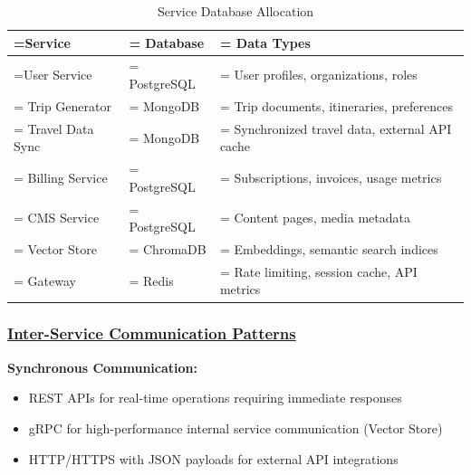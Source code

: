 \begin{table}[H]
    \renewcommand{\arraystretch}{1.3}
    \caption{Service Database Allocation}
    \centering
    \medskip
    \begin{tabularx}{1\textwidth} {
            | >{\hsize=0.6\hsize\linewidth=\hsize\centering\arraybackslash}X
            | >{\hsize=0.7\hsize\linewidth=\hsize\centering\arraybackslash}X
            | >{\hsize=0.7\hsize\linewidth=\hsize\justifying\arraybackslash}X |}
        \hline
        \textbf{Service} & \textbf{Database} & \textbf{Data Types}                          \\
        \hline
        User Service     & PostgreSQL        & User profiles, organizations, roles          \\
        \hline
        Trip Generator   & MongoDB           & Trip documents, itineraries, preferences     \\
        \hline
        Travel Data Sync & MongoDB           & Synchronized travel data, external API cache \\
        \hline
        Billing Service  & PostgreSQL        & Subscriptions, invoices, usage metrics       \\
        \hline
        CMS Service      & PostgreSQL        & Content pages, media metadata                \\
        \hline
        Vector Store     & ChromaDB          & Embeddings, semantic search indices          \\
        \hline
        Gateway          & Redis             & Rate limiting, session cache, API metrics    \\
        \hline
    \end{tabularx}
\end{table}

\subsubsection*{\underline{Inter-Service Communication Patterns}}

\textbf{Synchronous Communication:}
\begin{itemize}
    \item REST APIs for real-time operations requiring immediate responses
    \item gRPC for high-performance internal service communication (Vector Store)
    \item HTTP/HTTPS with JSON payloads for external API integrations
\end{itemize}

